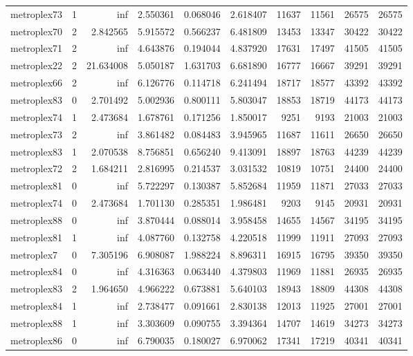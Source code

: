 \begin{longtable}{|l|r|r|r|r|r|r|r|r|r|}
metroplex73 & 1 & inf & 2.550361 & 0.068046 & 2.618407 & 11637 & 11561 & 26575 & 26575 \\
metroplex70 & 2 & 2.842565 & 5.915572 & 0.566237 & 6.481809 & 13453 & 13347 & 30422 & 30422 \\
metroplex71 & 2 & inf & 4.643876 & 0.194044 & 4.837920 & 17631 & 17497 & 41505 & 41505 \\
metroplex22 & 2 & 21.634008 & 5.050187 & 1.631703 & 6.681890 & 16777 & 16667 & 39291 & 39291 \\
metroplex66 & 2 & inf & 6.126776 & 0.114718 & 6.241494 & 18717 & 18577 & 43392 & 43392 \\
metroplex83 & 0 & 2.701492 & 5.002936 & 0.800111 & 5.803047 & 18853 & 18719 & 44173 & 44173 \\
metroplex74 & 1 & 2.473684 & 1.678761 & 0.171256 & 1.850017 & 9251 & 9193 & 21003 & 21003 \\
metroplex73 & 2 & inf & 3.861482 & 0.084483 & 3.945965 & 11687 & 11611 & 26650 & 26650 \\
metroplex83 & 1 & 2.070538 & 8.756851 & 0.656240 & 9.413091 & 18897 & 18763 & 44239 & 44239 \\
metroplex72 & 2 & 1.684211 & 2.816995 & 0.214537 & 3.031532 & 10819 & 10751 & 24400 & 24400 \\
metroplex81 & 0 & inf & 5.722297 & 0.130387 & 5.852684 & 11959 & 11871 & 27033 & 27033 \\
metroplex74 & 0 & 2.473684 & 1.701130 & 0.285351 & 1.986481 & 9203 & 9145 & 20931 & 20931 \\
metroplex88 & 0 & inf & 3.870444 & 0.088014 & 3.958458 & 14655 & 14567 & 34195 & 34195 \\
metroplex81 & 1 & inf & 4.087760 & 0.132758 & 4.220518 & 11999 & 11911 & 27093 & 27093 \\
metroplex7 & 0 & 7.305196 & 6.908087 & 1.988224 & 8.896311 & 16915 & 16795 & 39350 & 39350 \\
metroplex84 & 0 & inf & 4.316363 & 0.063440 & 4.379803 & 11969 & 11881 & 26935 & 26935 \\
metroplex83 & 2 & 1.964650 & 4.966222 & 0.673881 & 5.640103 & 18943 & 18809 & 44308 & 44308 \\
metroplex84 & 1 & inf & 2.738477 & 0.091661 & 2.830138 & 12013 & 11925 & 27001 & 27001 \\
metroplex88 & 1 & inf & 3.303609 & 0.090755 & 3.394364 & 14707 & 14619 & 34273 & 34273 \\
metroplex86 & 0 & inf & 6.790035 & 0.180027 & 6.970062 & 17341 & 17219 & 40341 & 40341 \\

\end{longtable}

